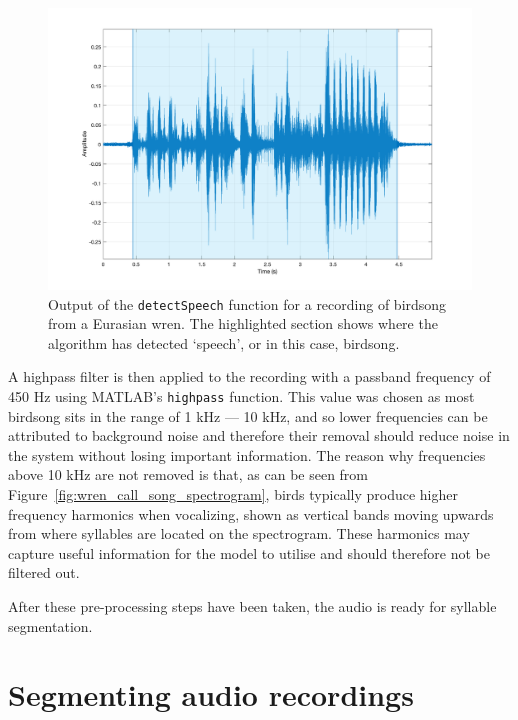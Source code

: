 \begin{figure}[ht]
  \centering
  \includegraphics[width=\textwidth]{figures/detected_speech.png}
  \caption{Output of the \texttt{detectSpeech} function for a recording of
  birdsong from a Eurasian wren. The highlighted section shows where the
algorithm has detected `speech', or in this case,
birdsong.}\label{fig:detected_speech}
\end{figure}

A highpass filter is then applied to the recording with a passband frequency of
450 Hz using MATLAB's \texttt{highpass} function. This value was chosen
as most birdsong sits in the range of 1 kHz --- 10 kHz, and so lower frequencies
can be attributed to background noise and therefore their removal should reduce
noise in the system without losing important information. The reason why
frequencies above 10 kHz are not removed is that, as can be seen from
Figure~\ref{fig:wren_call_song_spectrogram}, birds typically produce higher
frequency harmonics when vocalizing, shown as vertical bands moving upwards from
where syllables are located on the spectrogram. These harmonics may capture
useful information for the model to utilise and should therefore not be filtered
out.

After these pre-processing steps have been taken, the audio is ready for
syllable segmentation.

\section{Segmenting audio recordings}\label{sec:segmentation}

